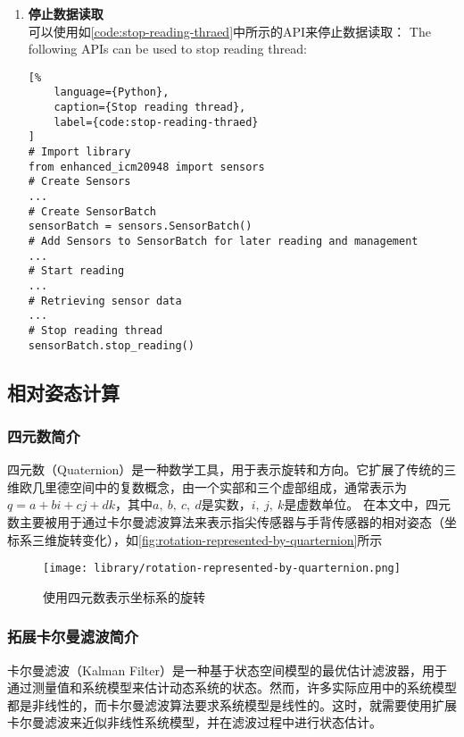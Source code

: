 \begin{enumerate}[label=(\alph*)]
\begin{lstlisting}[%
    language={Python},
    caption={Retrieve sensor data},
    label={code:retrieve-sensor-data}
]
# Create SensorBatch
...
# Add Sensors to SensorBatch for later reading and management
...
# Start reading
...
# Retrieving sensor data
# Get accelerometer data
accData = firstSensor.get_accel_data()
# Get gyroscope data
gyroData = firstSensor.get_gyro_data()
# Get magnetometer data
magData = firstSensor.get_mag_data()
\end{lstlisting}
    \item {\bfseries 停止数据读取} \\
可以使用如\autoref{code:stop-reading-thraed}中所示的API来停止数据读取：
The following APIs can be used to stop reading thread:
\begin{lstlisting}[%
    language={Python},
    caption={Stop reading thread},
    label={code:stop-reading-thraed}
]
# Import library
from enhanced_icm20948 import sensors
# Create Sensors
...
# Create SensorBatch
sensorBatch = sensors.SensorBatch()
# Add Sensors to SensorBatch for later reading and management
...
# Start reading
...
# Retrieving sensor data
...
# Stop reading thread
sensorBatch.stop_reading()
\end{lstlisting}
\end{enumerate}

\subsection{相对姿态计算}
\subsubsection{四元数简介}
四元数（Quaternion）是一种数学工具，用于表示旋转和方向。它扩展了传统的三维欧几里德空间中的复数概念，由一个实部和三个虚部组成，通常表示为$ q = a + bi + cj + dk$，其中$a,\ b,\ c,\ d$是实数，$i,\ j,\ k$是虚数单位。
在本文中，四元数主要被用于通过卡尔曼滤波算法来表示指尖传感器与手背传感器的相对姿态（坐标系三维旋转变化），如\autoref{fig:rotation-represented-by-quarternion}所示

\begin{figure}[H]
    \centering
    \texttt{[image: library/rotation-represented-by-quarternion.png]}
    \caption{\label{fig:rotation-represented-by-quarternion}使用四元数表示坐标系的旋转}
\end{figure}

\subsubsection{拓展卡尔曼滤波简介}
卡尔曼滤波（Kalman Filter）是一种基于状态空间模型的最优估计滤波器，用于通过测量值和系统模型来估计动态系统的状态。然而，许多实际应用中的系统模型都是非线性的，而卡尔曼滤波算法要求系统模型是线性的。这时，就需要使用扩展卡尔曼滤波来近似非线性系统模型，并在滤波过程中进行状态估计。

